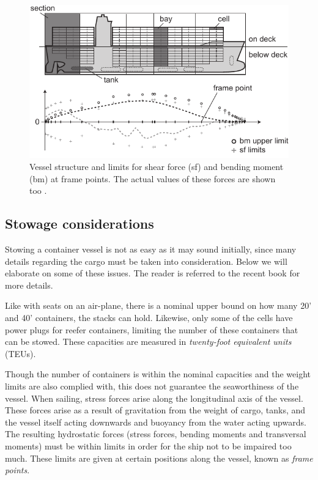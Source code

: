 \begin{figure}[pos=htbp]
	\centering
		\includegraphics{figures/vessel1.pdf} 
	\caption{Vessel structure and limits for shear force (sf) and bending moment (bm) at frame points. The actual values of these forces are shown too .}
	\label{fig:vesselA}
\end{figure}

\subsection{Stowage considerations}
Stowing a container vessel is not as easy as it may sound initially, since many details regarding the cargo must be taken into consideration.
Below we will elaborate on some of these issues. The reader is referred to the recent book \cite{JPAV18} for more details.

Like with seats on an air-plane, there is a nominal upper bound on how many 20' and 40' containers, the stacks can hold. Likewise, only some of the cells have power plugs for reefer containers, limiting the number of these containers that can be stowed. These capacities are measured in \emph{twenty-foot equivalent units} (TEUs). 

Though the number of containers is within the nominal capacities and the weight limits are also complied with, this does not guarantee the  seaworthiness of the vessel. When sailing, stress forces arise along the longitudinal axis of the vessel. These forces arise as a result of gravitation from the weight of cargo, tanks, and the vessel itself acting downwards and buoyancy from the water acting upwards. The resulting hydrostatic forces (stress forces, bending moments and transversal moments) must be within limits in order for the ship not to be impaired too much. These limits are given at certain positions along the vessel, known as \emph{frame points}. 

